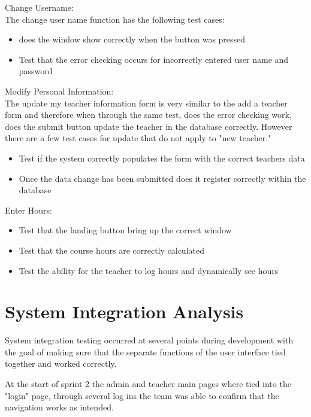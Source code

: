 Change Username:\\
The change user name function has the following test cases:

\begin{itemize}
\item does the window show correctly when the button was pressed
\item Test that the error checking occurs for incorrectly entered user name and password 
\end{itemize}

Modify Personal Information:\\

The update my teacher information form is very similar to the add a teacher form and therefore when through the same test, does the error checking work, does the submit button update the teacher in the database correctly. However there are a few test cases for update that do not apply to "new teacher."

\begin{itemize}
\item Test if the system correctly populates the form with the correct teachers data
\item Once the data change has been submitted does it register correctly within the database
\end{itemize}

Enter Hours:\\

\begin{itemize}
\item Test that the landing button bring up the correct window
\item Test that the course hours are correctly calculated
\item Test the ability for the teacher to log hours and dynamically see hours
\end{itemize} 





\section{System Integration Analysis}
System integration testing occurred at several points during development with the goal of making sure that the separate functions of the user interface tied together and worked correctly.

At the start of sprint 2 the admin and teacher main pages where tied into the "login" page, through several log ins the team was able to confirm that the navigation works as intended.

